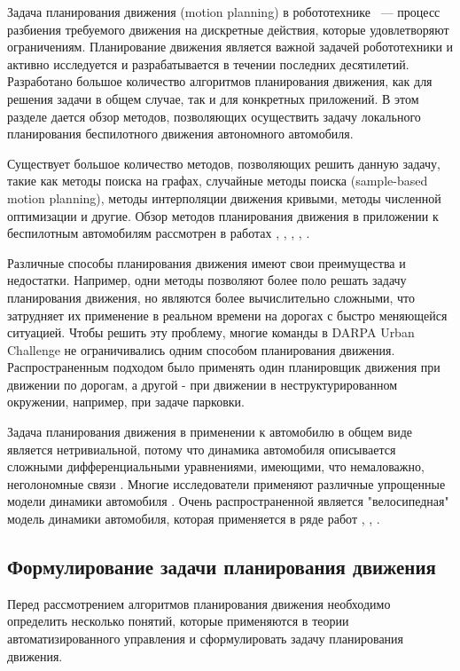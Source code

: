 Задача планирования движения (motion planning) в робототехнике ~--- процесс разбиения требуемого движения
на дискретные действия, которые удовлетворяют ограничениям. Планирование движения является важной задачей
робототехники и активно  исследуется и разрабатывается в течении последних десятилетий. Разработано большое
количество алгоритмов планирования движения, как для решения задачи в общем случае, так и для конкретных
приложений. В этом разделе дается обзор методов, позволяющих осуществить задачу локального планирования
беспилотного движения автономного автомобиля.

Существует большое количество методов, позволяющих решить данную задачу, такие как методы поиска на графах,
случайные методы поиска (sample-based motion planning), методы интерполяции движения кривыми, методы
численной оптимизации и другие. Обзор методов планирования движения в приложении к беспилотным автомобилям
рассмотрен в работах \cite{motion_planning_survey}, \cite{motion_planning_review},
\cite{motion_planning_overview_obstacles}, \cite{motion_planning_overview_modern},
\cite{motion_planning_review_2}.

Различные способы планирования движения имеют свои преимущества и недостатки. Например, одни методы позволяют
более поло решать задачу планирования движения, но являются более вычислительно сложными, что затрудняет их
применение в реальном времени на дорогах с быстро меняющейся ситуацией.  Чтобы решить эту проблему, многие
команды в DARPA Urban Challenge не ограничивались одним способом планирования движения. Распространенным подходом
было применять один планировщик движения при движении по дорогам, а другой - при движении в неструктурированном окружении,
например, при задаче парковки.

Задача планирования движения в применении к автомобилю в общем виде является нетривиальной, потому что
динамика автомобиля описывается сложными дифференциальными уравнениями, имеющими, что немаловажно,
неголономные связи \cite{car_frund}. Многие исследователи применяют различные упрощенные модели динамики
автомобиля \cite{car_dynamics_1}. Очень распространенной является "велосипедная" модель динамики
автомобиля, которая применяется в ряде работ \cite{car_dynamics_bycicle_model_1}, \cite{car_dynamics_bycicle_model_2},
\cite{darpa_annieway_navigation}.


\subsection{Формулирование задачи планирования движения}
Перед рассмотрением алгоритмов планирования движения необходимо определить несколько понятий, которые
применяются в теории автоматизированного управления и сформулировать задачу планирования движения.

